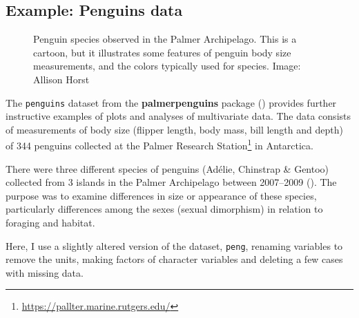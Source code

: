 \documentclass[
  letterpaper,
  10pt,
  krantz2]{krantz}
\providecommand{\href}[2]{#2\footnote{\url{#1}}}
\begin{document}
{\subsection{Example: Penguins data}\label{sec-penguins}

\begin{figure}


\caption{\label{fig-penguin-species}Penguin species observed in the
Palmer Archipelago. This is a cartoon, but it illustrates some features
of penguin body size measurements, and the colors typically used for
species. Image: Allison Horst}

\end{figure}%

The \texttt{penguins} dataset from the \textbf{palmerpenguins} package
() provides further
instructive examples of plots and analyses of multivariate data. The
data consists of measurements of body size (flipper length, body mass,
bill length and depth) of 344 penguins collected at the
\href{https://pallter.marine.rutgers.edu/}{Palmer Research Station} in
Antarctica.

There were three different species of penguins (Adélie, Chinstrap \&
Gentoo) collected from 3 islands in the Palmer Archipelago between
2007--2009 (). The purpose
was to examine differences in size or appearance of these species,
particularly differences among the sexes (sexual dimorphism) in relation
to foraging and habitat.

Here, I use a slightly altered version of the dataset, \texttt{peng},
renaming variables to remove the units, making factors of character
variables and deleting a few cases with missing data.

}
\end{document}
